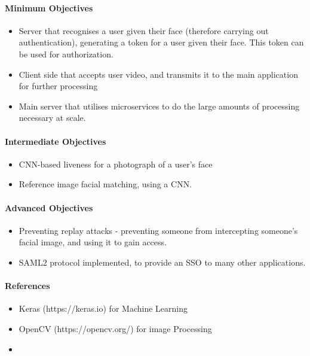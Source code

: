 \documentclass{article}
\begin{document}
    \paragraph{Minimum Objectives}
        \begin{itemize}
            \item Server that recognises a user given their face (therefore carrying out authentication), generating a token for a user given their face. This token can be used for authorization.
            \item Client side that accepts user video, and transmits it to the main application for further processing
            \item Main server that utilises microservices to do the large amounts of processing necessary at scale.
        \end{itemize}
    \paragraph{Intermediate Objectives}
        \begin{itemize}
            \item CNN-based liveness for a photograph of a user's face
            \item Reference image facial matching, using a CNN.
        \end{itemize}
    \paragraph{Advanced Objectives}
        \begin{itemize}
            \item Preventing replay attacks - preventing someone from intercepting someone's facial image, and using it to gain access.
            \item SAML2 protocol implemented, to provide an SSO to many other applications.
        \end{itemize}
    \paragraph{References}
        \begin{itemize}
            \item Keras (https://keras.io) for Machine Learning
            \item OpenCV (https://opencv.org/) for image Processing
            \item 
        \end{itemize}
\end{document}
